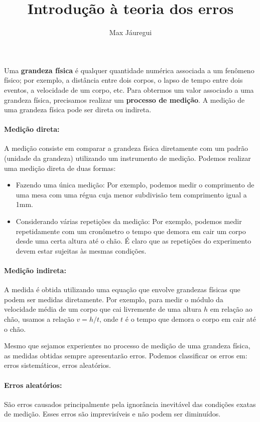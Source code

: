 \documentclass[12pt, a4paper]{article}
\title{Introdução à teoria dos erros}
\author{Max Jáuregui}
\begin{document}
\maketitle

Uma \textbf{grandeza física} é qualquer quantidade numérica associada a um fenômeno físico; por exemplo, a distância entre dois corpos, o lapso de tempo entre dois eventos, a velocidade de um corpo, etc. Para obtermos um valor associado a uma grandeza física, precisamos realizar um \textbf{processo de medição}. A medição de uma grandeza física pode ser direta ou indireta.

\paragraph{Medição direta:} A medição consiste em comparar a grandeza física diretamente com um padrão (unidade da grandeza) utilizando um instrumento de medição. Podemos realizar uma medição direta de duas formas:
\begin{itemize}
	\item Fazendo uma única medição: Por exemplo, podemos medir o comprimento de uma mesa com uma régua cuja menor subdivisão tem comprimento igual a 1mm.
	\item Considerando várias repetições da medição: Por exemplo, podemos medir repetidamente com um cronômetro o tempo que demora em cair um corpo desde uma certa altura até o chão. É claro que as repetições do experimento devem estar sujeitas às mesmas condições.
\end{itemize}

\paragraph{Medição indireta:}
A medida é obtida utilizando uma equação que envolve grandezas físicas que podem ser medidas diretamente. Por exemplo, para medir o módulo da velocidade média de um corpo que cai livremente de uma altura $h$ em relação ao chão, usamos a relação $v=h/t$, onde $t$ é o tempo que demora o corpo em cair até o chão.

Mesmo que sejamos experientes no processo de medição de uma grandeza física, as medidas obtidas sempre apresentarão erros. Podemos classificar os erros em: erros sistemáticos, erros aleatórios.

\paragraph{Erros aleatórios:} São erros causados principalmente pela ignorância inevitável das condições exatas de medição. Esses erros são imprevisíveis e não podem ser diminuídos.
\end{document}
